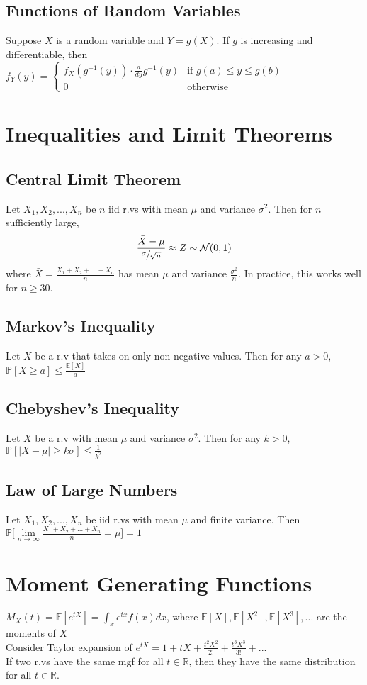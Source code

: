 \documentclass{article}
\renewcommand{\P}{\mathbb{P}}
\newcommand{\E}{\mathbb{E}}
\begin{document}
\subsection{Functions of Random Variables}
Suppose $X$ is a random variable and $Y=g(X)$. If $g$ is increasing and differentiable, then \\
$f_Y(y) = \begin{cases} f_X(g^{-1}(y)) \cdot \frac{d}{dy}g^{-1}(y) & \text{if } g(a) \leq y \leq g(b) \\ 
0 & \text{otherwise} \end{cases}$


\section{Inequalities and Limit Theorems}
\subsection{Central Limit Theorem}
Let $X_1, X_2, ..., X_n$ be $n$ iid r.vs with mean $\mu$ and variance $\sigma^2$. Then for $n$ sufficiently large,
$$\frac{\bar{X} - \mu}{\sfrac{\sigma}{\sqrt{n}}} \approx Z \sim \mathcal{N}(0, 1)$$
where $\bar{X} = \frac{X_1 + X_2 + ... + X_n}{n}$ has mean $\mu$ and variance $\frac{\sigma^2}{n}$. In practice, this works well for $n \geq 30$.
\subsection{Markov's Inequality}
Let $X$ be a r.v that takes on only non-negative values. Then for any $a > 0$, $\P[X \geq a] \leq \frac{\E[X]}{a}$
\subsection{Chebyshev's Inequality}
Let $X$ be a r.v with mean $\mu$ and variance $\sigma^2$. Then for any $k > 0$, $\P[|X - \mu| \geq k \sigma] \leq \frac{1}{k^2}$
\subsection{Law of Large Numbers}
Let $X_1, X_2, ..., X_n$ be iid r.vs with mean $\mu$ and finite variance. Then $\P\Big[\lim\limits_{n\to \infty} \frac{X_1 + X_2 + ... + X_n}{n} = \mu \Big] = 1$ 

\section{Moment Generating Functions}
$M_X(t) = \E[e^{tX}] = \int_x e^{tx}f(x)dx$, where $\E[X], \E[X^2], \E[X^3], ...$ are the moments of $X$ \\
Consider Taylor expansion of $e^{tX} = 1 + tX + \frac{t^2X^2}{2!} + \frac{t^3X^3}{3!} + ... $ \\
If two r.vs have the same mgf for all $t \in \mathbb{R}$, then they have the same distribution for all $t \in \mathbb{R}$.
\end{document}
